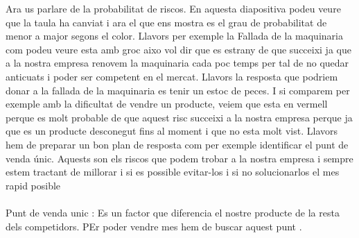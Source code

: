 \documentclass[12pt, a4papre]{article}
\begin{document}
Ara us parlare de la probabilitat de riscos. En aquesta diapositiva podeu veure que la taula ha canviat i ara el que ens mostra es el grau de probabilitat de menor a major segons el color.
 Llavors per exemple la Fallada de la maquinaria com podeu veure esta amb groc aixo vol dir que es estrany de que succeixi ja que a la nostra empresa renovem la maquinaria  cada poc temps per tal de no quedar anticuats i poder ser competent en el mercat. Llavors  la resposta que podriem donar a la fallada de la maquinaria  es  tenir un estoc de peces. I si comparem per exemple amb la dificultat de vendre un producte, veiem que esta en vermell perque es molt probable de que aquest risc succeixi a la nostra empresa perque ja que es  un producte desconegut fins al moment i que no esta molt vist. Llavors hem de preparar un bon plan de resposta com per exemple identificar el punt de venda únic. Aquests son els riscos que podem trobar a la nostra empresa i sempre estem tractant de millorar i si es possible evitar-los i si no solucionarlos el mes rapid posible \\\\



Punt de venda unic : Es un factor que diferencia el nostre producte de la resta dels competidors. PEr poder vendre mes hem de buscar aquest punt . 
\end{document}
